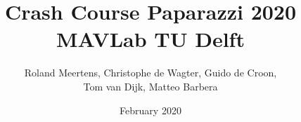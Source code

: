 \documentclass{report}
\begin{document}
\author{Roland Meertens, Christophe de Wagter, Guido de Croon,\\Tom van Dijk, Matteo Barbera}
\title{\bf Crash Course Paparazzi 2020\\MAVLab TU Delft}
\date{February 2020}
\maketitle

\tableofcontents

\setlength{\parindent}{0em}





	
\end{document}

